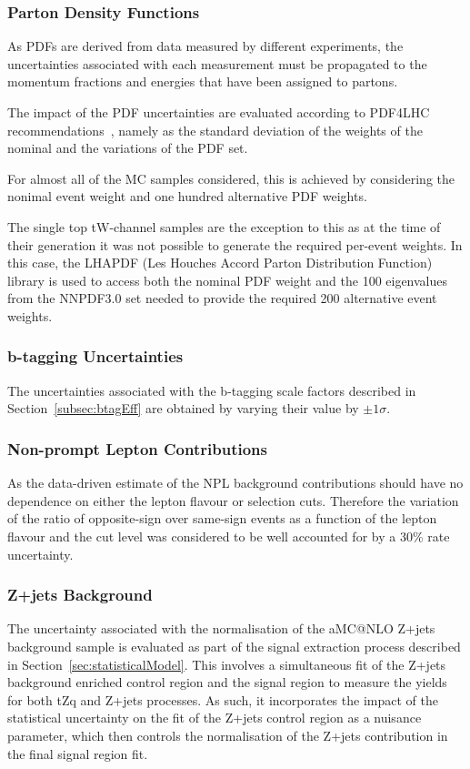 \subsubsection*{Parton Density Functions}\label{subsec:pdfSysts}
As PDFs are derived from data measured by different experiments, the uncertainties associated with each measurement must be propagated to the momentum fractions and energies that have been assigned to partons.

The impact of the PDF uncertainties are evaluated according to PDF4LHC recommendations~\cite{Butterworth:2015oua}, namely as the standard deviation of the weights of the nominal and the variations of the PDF set.

For almost all of the MC samples considered, this is achieved by considering the nonimal event weight and one hundred alternative PDF weights.

The single top tW-channel samples are the exception to this as at the time of their generation it was not possible to generate the required per-event weights.
In this case, the LHAPDF (Les Houches Accord Parton Distribution Function) library is used to access both the nominal PDF weight and the 100 eigenvalues from the NNPDF3.0 set needed to provide the required 200 alternative event weights.

\subsubsection*{b-tagging Uncertainties}
The uncertainties associated with the b-tagging scale factors described in Section~\ref{subsec:btagEff} are obtained by varying their value by $\pm 1\sigma$.

\subsubsection*{Non-prompt Lepton Contributions}
As the data-driven estimate of the NPL background contributions should have no dependence on either the lepton flavour or selection cuts.
Therefore the variation of the ratio of opposite-sign over same-sign events as a function of the lepton flavour and the cut level was considered to be well accounted for by a 30\% rate uncertainty.

\subsubsection*{Z+jets Background}
The uncertainty associated with the normalisation of the aMC@NLO Z+jets background sample is evaluated as part of the signal extraction process described in Section~\ref{sec:statisticalModel}.
This involves a simultaneous fit of the Z+jets background enriched control region and the signal region to measure the yields for both tZq and Z+jets processes.
As such, it incorporates the impact of the statistical uncertainty on the fit of the Z+jets control region as a nuisance parameter, which then controls the normalisation of the Z+jets contribution in the final signal region fit.

